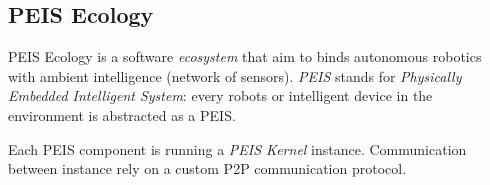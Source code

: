 \documentclass[a4paper]{article}
\begin{document}
\subsection{PEIS Ecology}
\label{sect|peis-ecology}

{\sc PEIS Ecology} is a software \emph{ecosystem} that aim to binds autonomous
robotics with ambient intelligence (network of sensors). \emph{PEIS} stands for
\emph{Physically Embedded Intelligent System}: every robots or intelligent
device in the environment is abstracted as a PEIS.

Each PEIS component is running a \emph{PEIS Kernel} instance. Communication between instance rely on a custom P2P communication protocol.


%
%
%
%
%
%
%
\end{document}
